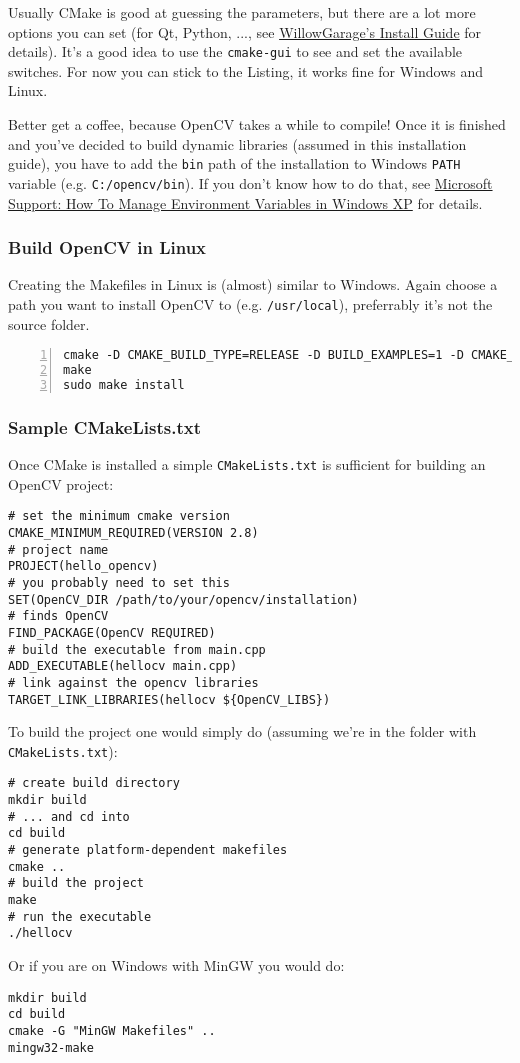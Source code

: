 Usually CMake is good at guessing the parameters, but there are a lot more options you can set (for Qt, Python, ..., see \href{http://opencv.willowgarage.com/wiki/InstallGuide}{WillowGarage's Install Guide} for details). It's a good idea to use the \lstinline|cmake-gui| to see and set the available switches. For now you can stick to the Listing, it works fine for Windows and Linux.

Better get a coffee, because OpenCV takes a while to compile! Once it is finished and you've decided to build dynamic libraries (assumed in this installation guide), you have to add the \lstinline|bin| path of the installation to Windows \lstinline|PATH| variable (e.g. \lstinline|C:/opencv/bin|). If you don't know how to do that, see \href{http://support.microsoft.com/kb/310519}{Microsoft Support: How To Manage Environment Variables in Windows XP} for details.

\subsubsection*{Build OpenCV in Linux}
Creating the Makefiles in Linux is (almost) similar to Windows. Again choose a path you want to install OpenCV to (e.g. \lstinline|/usr/local|), preferrably it's not the source folder.

\begin{lstlisting}[numberstyle=\footnotesize, numbers=left]
cmake -D CMAKE_BUILD_TYPE=RELEASE -D BUILD_EXAMPLES=1 -D CMAKE_INSTALL_PREFIX=/usr/local ..
make 
sudo make install
\end{lstlisting}

\subsubsection*{Sample CMakeLists.txt}
Once CMake is installed a simple \lstinline|CMakeLists.txt| is sufficient for building an OpenCV project:

\lstset{
	language=cmake,
}
\begin{lstlisting}
# set the minimum cmake version 
CMAKE_MINIMUM_REQUIRED(VERSION 2.8)
# project name
PROJECT(hello_opencv)
# you probably need to set this
SET(OpenCV_DIR /path/to/your/opencv/installation)
# finds OpenCV
FIND_PACKAGE(OpenCV REQUIRED)
# build the executable from main.cpp
ADD_EXECUTABLE(hellocv main.cpp)
# link against the opencv libraries
TARGET_LINK_LIBRARIES(hellocv ${OpenCV_LIBS})
\end{lstlisting}

To build the project one would simply do (assuming we're in the folder with \lstinline|CMakeLists.txt|):

\lstset{
	language=sh,
}
\begin{lstlisting}
# create build directory 
mkdir build
# ... and cd into
cd build
# generate platform-dependent makefiles
cmake ..
# build the project
make
# run the executable
./hellocv
\end{lstlisting}

Or if you are on Windows with MinGW you would do:

\begin{lstlisting}
mkdir build
cd build
cmake -G "MinGW Makefiles" ..
mingw32-make
\end{lstlisting}
